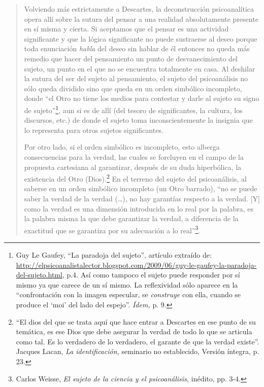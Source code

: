 \begin{quote}
Volviendo más estrictamente a Descartes, la deconstrucción psicoanalítica opera allí sobre la sutura del pensar a una realidad absolutamente presente en sí misma y cierta. Si aceptamos que el pensar es una actividad significante y que la lógica significante no puede sustraerse al deseo porque toda enunciación \emph{habla} del deseo sin hablar de él  entonces no queda más remedio que hacer del pensamiento un punto de desvanecimiento del sujeto, un punto en el que no se encuentra totalmente en casa. Al deshilar la sutura del ser del sujeto al pensamiento, el sujeto del psicoanálisis no sólo queda dividido sino que queda en un orden simbólico incompleto, donde \enquote{el Otro no tiene los medios para contestar y darle al sujeto su signo de sujeto}\footnote{Guy Le Gaufey, \enquote{La paradoja del sujeto}, artículo extraído de: \url{http://elpsicoanalistalector.blogspot.com/2009/06/guy-le-gaufey-la-paradoja-del-sujeto.html}, p.4. Así como tampoco el sujeto puede responder por sí mismo ya que carece de un sí mismo. La reflexividad sólo aparece en la \enquote{confrontación con la imagen especular, se \emph{construye} con ella, cuando se produce el \enquote{moi} del lado del espejo}. \emph{Ídem,} p. 9.}, aun si es de allí (del tesoro de significantes, la cultura, los discursos, etc.) de donde el sujeto toma inconscientemente la insignia que lo representa para otros sujetos significantes.

Por otro lado, si el orden simbólico es incompleto, esto alberga consecuencias para la verdad, las cuales se forcluyen en el campo de la propuesta cartesiana al garantizar, después de su duda hiperbólica, la existencia del Otro (Dios).\footnote{\enquote{El dios del que se trata aquí que hace entrar a Descartes en ese punto de su temática, es ese Dios que debe asegurar la verdad de todo lo que se articula como tal. Es lo verdadero de lo verdadero, el garante de que la verdad existe}. Jacques Lacan, \emph{La identificación,} seminario no establecido, Versión íntegra, p. 23.} En el terreno del sujeto del psicoanálisis, al saberse en un orden simbólico incompleto (un Otro barrado), \enquote{no se puede saber la verdad de la verdad (\dots), no hay garantías respecto a la verdad. {[}Y{]} como la verdad es una dimensión introducida en lo real por la palabra, es la palabra misma la que debe garantizar la verdad, a diferencia de la exactitud que se garantiza por su adecuación a lo real}\footnote{Carlos Weisse, \emph{El sujeto de la ciencia y el psicoanálisis,} inédito, pp. 3-4.}.


\end{quote}
